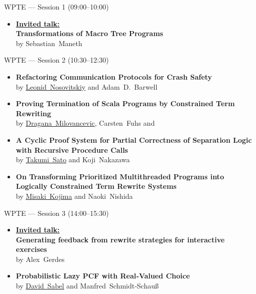 \documentclass[11pt]{beamer}
\newcommand{\sessionbreaktext}{}
\newenvironment{sessionframe}[2]{%
  \renewcommand{\sessionbreaktext}{#2}%
  \begin{frame}[t]{#1}%
}{%
  \end{frame}%
}
\begin{document}
\begin{sessionframe}{WPTE --- Session 1 (09:00--10:00)}{Break: 10:00--10:30 (coffee)}
  \vspace*{\fill}
  \begin{itemize}
    \item \underline{\textbf{Invited talk:}}\\
      \textbf{Transformations of Macro Tree Programs}\\
      by \mbox{Sebastian Maneth}
  \end{itemize}
\end{sessionframe}

\begin{sessionframe}{WPTE --- Session 2 (10:30--12:30)}{Break: 12:30--14:00 (lunch)}
  \vspace*{\fill}
  \begin{itemize}
    \item \textbf{Refactoring Communication Protocols for Crash Safety}\\
      by \mbox{\underline{Leonid Nosovitskiy}} and \mbox{Adam D. Barwell}
    \vspace*{\fill}
    \item \textbf{Proving Termination of Scala Programs by Constrained Term Rewriting}\\
      by \mbox{\underline{Dragana Milovancevic}}, \mbox{Carsten Fuhs} and 
    \vspace*{\fill}
    \item \textbf{A Cyclic Proof System for Partial Correctness of Separation Logic with Recursive Procedure Calls}\\
      by \mbox{\underline{Takumi Sato}} and \mbox{Koji Nakazawa}
    \vspace*{\fill}
    \item \textbf{On Transforming Prioritized Multithreaded Programs into Logically Constrained Term Rewrite Systems}\\
      by \mbox{\underline{Misaki Kojima}} and \mbox{Naoki Nishida}
  \end{itemize}
\end{sessionframe}

\begin{sessionframe}{WPTE --- Session 3 (14:00--15:30)}{Break: 15:30--16:00 (coffee)}
  \vspace*{\fill}
  \begin{itemize}
    \item \underline{\textbf{Invited talk:}}\\
      \textbf{Generating feedback from rewrite strategies for interactive exercises}\\
      by \mbox{Alex Gerdes}
    \vspace*{\fill}
    \item \textbf{Probabilistic Lazy PCF with Real‐Valued Choice}\\
      by \mbox{\underline{David Sabel}} and \mbox{Manfred Schmidt‐Schauß}
  \end{itemize}
\end{sessionframe}
\end{document}
